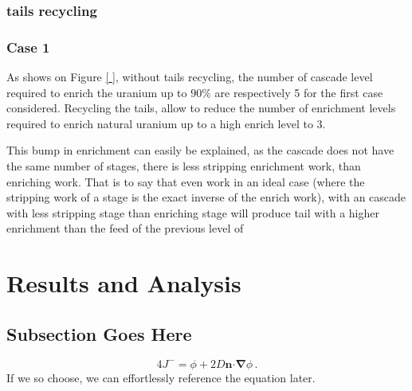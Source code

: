 \documentclass{anstrans}
\renewcommand{\vec}[1]{\bm{#1}} %
\newcommand{\vd}{\bm{\cdot}} %
\newcommand{\grad}{\vec{\nabla}} %
\begin{document}
\subsubsection{tails recycling}
\subsubsection{Case 1}
As shows on Figure \ref{ }, without tails recycling, the number of cascade level
required to enrich the uranium up to $90\%$ are respectively 5 for the
first case considered. Recycling the tails, allow to reduce the number of
enrichment levels required to enrich natural uranium up to a high enrich level
to 3.

This bump in enrichment can easily be explained, as the cascade does not have the
same number of stages, there is less stripping enrichment work, than enriching
work. That is to say that even work in an ideal case (where the stripping work of a
stage is the exact inverse of the enrich work), with an cascade with less
stripping stage than enriching stage will produce tail with a higher enrichment
than the feed of the previous level of


\section{Results and Analysis}

\subsection{Subsection Goes Here}
\begin{equation} \label{eq:marshak}
  4 J^- = \phi + 2 D \vec{n} \vd \grad \phi \,.
\end{equation}
If we so choose, we can effortlessly reference the equation later.
\end{document}
